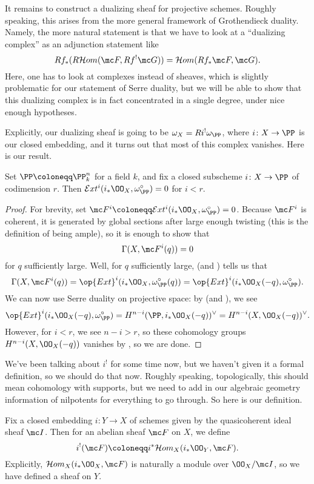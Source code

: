 \documentclass[../notes.tex]{subfiles}
\begin{document}
It remains to construct a dualizing sheaf for projective schemes. Roughly speaking, this arises from the more general framework of Grothendieck duality. Namely, the more natural statement is that we have to look at a ``dualizing complex'' as an adjunction statement like
\[Rf_*(R\mathcal Hom(\mc F,Rf^!\mc G))=\mathcal Hom(Rf_*\mc F,\mc G).\]
Here, one has to look at complexes instead of sheaves, which is slightly problematic for our statement of Serre duality, but we will be able to show that this dualizing complex is in fact concentrated in a single degree, under nice enough hypotheses.

Explicitly, our dualizing sheaf is going to be $\omega_X=Ri^!\omega_\PP$, where $i\colon X\to\PP$ is our closed embedding, and it turns out that most of this complex vanishes. Here is our result.
\begin{proposition}
	Set $\PP\coloneqq\PP^n_k$ for a field $k$, and fix a closed subscheme $i\colon X\to\PP$ of codimension $r$. Then $\mathcal Ext^i(i_*\OO_X,\omega_\PP^\circ)=0$ for $i<r$.
\end{proposition}
\begin{proof}
	For brevity, set $\mc F^i\coloneqq\mathcal Ext^i(i_*\OO_X,\omega_\PP^\circ)=0$. Because $\mc F^i$ is coherent, it is generated by global sections after large enough twisting (this is the definition of being ample), so it is enough to show that
	\[\Gamma(X,\mc F^i(q))=0\]
	for $q$ sufficiently large. Well, for $q$ sufficiently large,  (and ) tells us that
	\[\Gamma(X,\mc F^i(q))=\op{Ext}^i(i_*\OO_X,\omega^\circ_\PP(q))=\op{Ext}^i(i_*\OO_X(-q),\omega^\circ_\PP).\]
	We can now use Serre duality on projective space: by  (and ), we see
	\[\op{Ext}^i(i_*\OO_X(-q),\omega^\circ_\PP)=H^{n-i}(\PP,i_*\OO_X(-q))^\lor=H^{n-i}(X,\OO_X(-q))^\lor.\]
	However, for $i<r$, we see $n-i>r$, so these cohomology groups $H^{n-i}(X,\OO_X(-q))$ vanishes by , so we are done.
\end{proof}
We've been talking about $i^!$ for some time now, but we haven't given it a formal definition, so we should do that now. Roughly speaking, topologically, this should mean cohomology with supports, but we need to add in our algebraic geometry information of nilpotents for everything to go through. So here is our definition.
\begin{definition}
	Fix a closed embedding $i\colon Y\to X$ of schemes given by the quasicoherent ideal sheaf $\mc I$. Then for an abelian sheaf $\mc F$ on $X$, we define
	\[i^!(\mc F)\coloneqq i^*\mathcal Hom_X(i_*\OO_Y,\mc F).\]
	Explicitly, $\mathcal Hom_X(i_*\OO_X,\mc F)$ is naturally a module over $\OO_X/\mc I$, so we have defined a sheaf on $Y$.
\end{definition}
\end{document}
